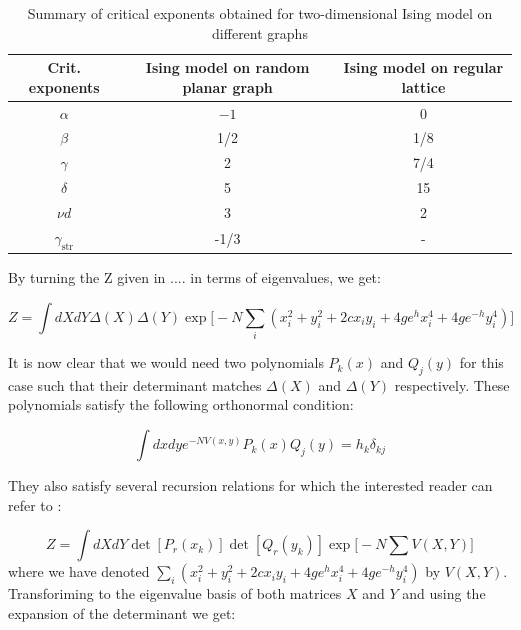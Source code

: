 \documentclass[11pt]{article}
\begin{document}
\vspace{10mm} 
\begin{table} 
	\begin{center} 
\begin{tabular}{|c|c|c|}
	\hline Crit. exponents & Ising model on random planar graph & Ising model on regular lattice \\
	\hline$\alpha$ & $-1$ & 0 \\
	$\beta$ & 1/2 & 1/8 \\
	$\gamma$ & 2 & 7/4 \\
	$\delta$ & 5 & 15 \\
	$\nu d$ & 3 & 2 \\
	$\gamma_{\text {str}}$ & -1/3 & - \\
	\hline
\end{tabular}
\end{center} 
	\caption{Summary of critical exponents obtained for two-dimensional Ising model on different graphs} 
	\label{table:crit_exp}
	\end{table} 



\vspace{10mm}
By turning the Z given in .... in terms of eigenvalues, we get:

\begin{equation}
	Z = \int dX dY \Delta(X) \Delta(Y)
	 \exp \Big[-N \sum_{i} (x_{i}^2 + y_{i}^{2} +2c x_{i}y_{i} + 4ge^{h}x_{i}^{4} + 4ge^{-h}y_{i}^4) \Big]
	\end{equation}

It is now clear that we would need two polynomials $P_{k}(x)$ and $Q_{j}(y)$ for this case such that their determinant matches 
$\Delta(X)$ and $\Delta(Y)$ respectively. 
These polynomials satisfy the following orthonormal condition: 

\begin{equation}
\int dx dy e^{-N V(x,y)} P_{k}(x) Q_{j}(y) = h_{k} \delta_{kj}
\end{equation}

They also satisfy several recursion relations for which the interested reader can refer to 
\cite{Boulatov:1986sb}:

\begin{equation}
	Z = \int dX dY \det[P_{r}(x_k)] \det[Q_{r}(y_k)] \exp\Big[-N \sum V(X,Y)\Big]
\end{equation}
where we have denoted $\sum_{i} (x_{i}^2 + y_{i}^{2} +2c x_{i}y_{i} + 4ge^{h}x_{i}^{4} + 4ge^{-h}y_{i}^4)$ by $V(X,Y)$. Transforiming to the eigenvalue basis of both matrices $X$ and $Y$ and using the expansion of the determinant we get:
\end{document}
